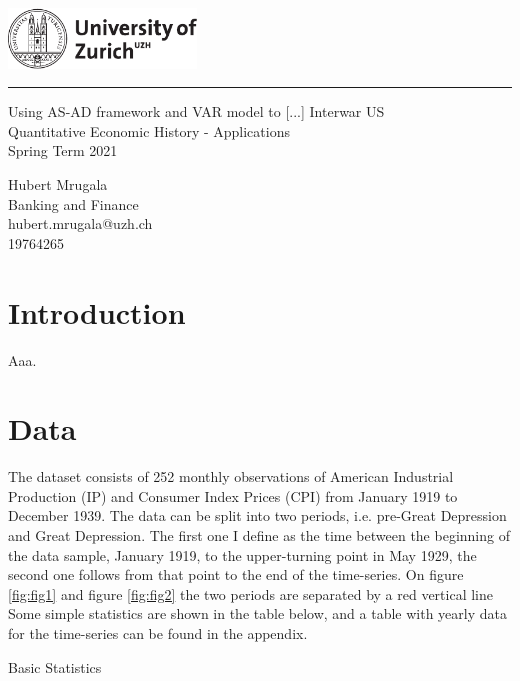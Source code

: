 \documentclass[a4paper,12pt]{article}
\begin{document}
\begin{titlepage}
\noindent\includegraphics[width=5cm]{uzh_logo_e_pos.pdf}
\noindent\rule{\textwidth}{0.4pt}
\vspace{1cm}
  \begin{center}
		{\LARGE Using AS-AD framework and VAR model to [...] Interwar US} \\
		{\Large Quantitative Economic History - Applications\\Spring Term 2021}
  \end{center}
\vfill

{\flushleft
Hubert Mrugala \\
Banking and Finance\\
hubert.mrugala@uzh.ch\\
19764265}  

\end{titlepage}

\pagebreak
\pagebreak

\section{Introduction}

Aaa.
\newpage

\section{Data}

The dataset consists of 252 monthly observations of American Industrial Production (IP) and Consumer Index Prices (CPI) from January 1919 to December 1939. The data can be split into two periods, i.e. pre-Great Depression and Great Depression. The first one I define as the time between the beginning of the data sample, January 1919, to the upper-turning point in May 1929, the second one follows from that point to the end of the time-series. On figure \ref{fig:fig1} and figure \ref{fig:fig2} the two periods are separated by a red vertical line Some simple statistics are shown in the table below, and a table with yearly data for the time-series can be found in the appendix. 

\begin{table}[h]
\label{table:1}
\caption{Basic Statistics}
\centering

\end{table}
\end{document}
